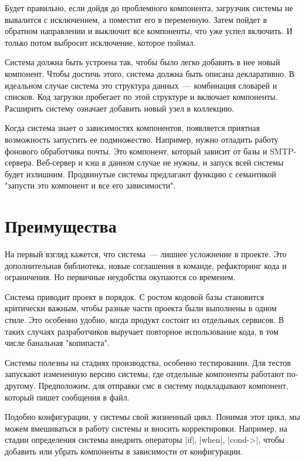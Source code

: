 Будет правильно, если дойдя до проблемного компонента, загрузчик системы не
вывалится с исключением, а поместит его в переменную. Затем пойдет в обратном
направлении и выключит все компоненты, что уже успел включить. И только потом
выбросит исключение, которое поймал.

Система должна быть устроена так, чтобы было легко добавить в нее новый
компонент. Чтобы достичь этого, система должна быть описана декларативно. В
идеальном случае система это структура данных~--- комбинация словарей и
списков. Код загрузки пробегает по этой структуре и включает
компоненты. Расширить систему означает добавить новый узел в коллекцию.

Когда система знает о зависимостях компонентов, появляется приятная возможность
запустить ее подмножество. Например, нужно отладить работу фонового обработчика
почты. Это компонент, который зависит от базы и SMTP-сервера. Веб-сервер и кэш в
данном случае не нужны, и запуск всей системы будет излишним. Продвинутые
системы предлагают функцию с семантикой "запусти это компонент и все его
зависимости".

\section{Преимущества}

На первый взгляд кажется, что система~--- лишнее усложнение в проекте. Это
дополнительная библиотека, новые соглашения в команде, рефакторинг кода и
ограничения. Но первичные неудобства окупаются со временем.

Система приводит проект в порядок. С ростом кодовой базы становится критически
важным, чтобы разные части проекта были выполнены в одном стиле. Это особенно
удобно, когда продукт состоит из отдельных сервисов. В таких случаях
разработчиков выручает повторное использование кода, в том числе банальная
"копипаста".

Системы полезны на стадиях производства, особенно тестировании. Для тестов
запускают измененную версию системы, где отдельные компоненты работают
по-другому. Предположим, для отправки смс в систему подкладывают компонент,
который пишет сообщения в файл.

Подобно конфигурации, у системы свой жизненный цикл. Понимая этот цикл, мы можем
вмешиваться в работу системы и вносить корректировки. Например, на стадии
определения системы внедрить операторы \spverb|if|, \spverb|when|, \spverb|cond->|, чтобы добавить
или убрать компоненты в зависимости от конфигурации.

